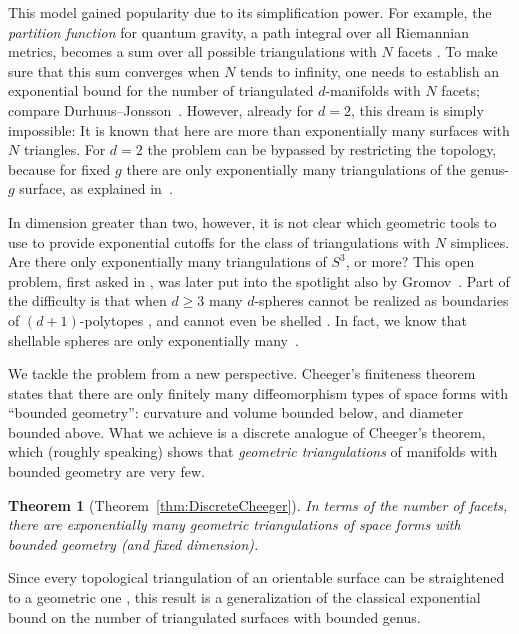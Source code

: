 \documentclass[a4paper,11pt]{article}
\theoremstyle{plain}
\newtheorem{thmnonumber}{\bf Theorem}
\theoremstyle{definition}
\begin{document}
This model gained popularity due to its simplification power. For example, the \emph{partition function} for quantum gravity, a path integral over all Riemannian metrics, becomes a sum over all possible triangulations with $N$ facets \cite{Weingarten}. To make sure that this sum converges when $N$ tends to infinity, one needs to establish an exponential bound for the number of triangulated $d$-manifolds with $N$ facets; compare Durhuus--Jonsson~\cite{DJ}. However, already for $d=2$, this dream is simply impossible: It is known that here are more than exponentially many surfaces with $N$ triangles.  
For $d=2$ the problem can be bypassed by restricting the topology, because for fixed $g$ there are only exponentially many triangulations of the genus-$g$ surface, as explained in~\cite{ADJ, Tutte}. 

In dimension greater than two, however, it is not clear which geometric tools to use to provide exponential cutoffs for the class of triangulations with $N$ simplices.  Are there only exponentially many triangulations of $S^3$, or more? This open problem, first asked in \cite{ADJ1}, was later put into the spotlight also by Gromov~\cite[pp.~156--157]{GromovQuestion}.
Part of the difficulty is that when $d \ge 3$ many $d$-spheres cannot be realized as boundaries of $(d+1)$-polytopes \cite{Kalai, PZ}, and cannot even be shelled \cite{HZ}. In fact, we know that shellable spheres are only exponentially many~\cite{BZ}. 


We tackle the problem from a new perspective.  Cheeger's finiteness theorem states that there are only finitely many diffeomorphism types of space forms with ``bounded geometry'': curvature and volume bounded below, and diameter bounded above. What we achieve is a discrete analogue of Cheeger's theorem, which (roughly speaking) shows that \emph{geometric triangulations} of manifolds with bounded geometry are very few. 

\begin{thmnonumber}[Theorem~\ref{thm:DiscreteCheeger}]\label{mainthm:cheeger} 
In terms of the number of facets, there are exponentially many geometric triangulations of space forms with bounded geometry (and fixed dimension).
\end{thmnonumber}
 
Since every topological triangulation of an orientable surface can be straightened to a geometric one \cite{Verdiere, Wagner}, this result is a generalization of the classical exponential bound on the number of triangulated surfaces with bounded genus.
\end{document}
